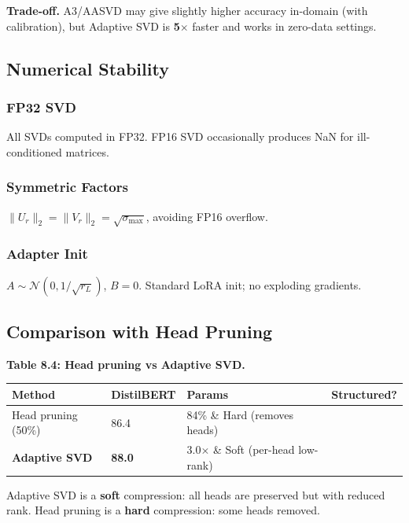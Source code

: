 \textbf{Trade-off.} A3/AASVD may give slightly higher accuracy in-domain (with 
calibration), but Adaptive SVD is \textbf{5$\times$} faster and works in 
zero-data settings.

\subsection{Numerical Stability}

\subsubsection{FP32 SVD}

All SVDs computed in FP32. FP16 SVD occasionally produces NaN for 
ill-conditioned matrices.

\subsubsection{Symmetric Factors}

$\|U_r\|_2 = \|V_r\|_2 = \sqrt{\sigma_\text{max}}$, avoiding FP16 overflow.

\subsubsection{Adapter Init}

$A \sim \mathcal{N}(0, 1/\sqrt{r_L})$, $B = 0$. Standard LoRA init; no 
exploding gradients.

\subsection{Comparison with Head Pruning}

\textbf{Table 8.4: Head pruning vs Adaptive SVD.}

\begin{table}[H]
\centering
\small
\begin{tabular}{llll}
\toprule
\textbf{Method} & \textbf{DistilBERT} & \textbf{Params} & \textbf{Structured?} \\
\midrule
Head pruning (50\%) & 86.4 & 84\% \& Hard (removes heads) \\
\textbf{Adaptive SVD} & \textbf{88.0} & 3.0$\times$ \& Soft (per-head low-rank) \\
\bottomrule
\end{tabular}
\end{table}

Adaptive SVD is a \textbf{soft} compression: all heads are preserved but with 
reduced rank. Head pruning is a \textbf{hard} compression: some heads removed.

